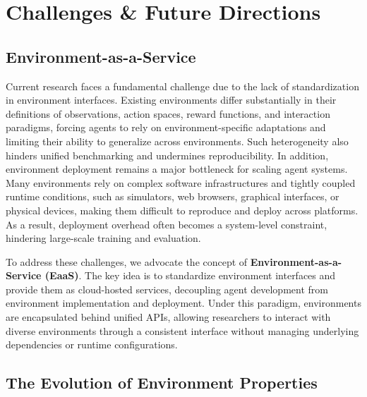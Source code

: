 
\section{Challenges \& Future Directions}\label{sec:future}

\subsection{Environment-as-a-Service}


Current research faces a fundamental challenge due to the lack of standardization in environment interfaces. 
Existing environments differ substantially in their definitions of observations, action spaces, reward functions, and interaction paradigms, forcing agents to rely on environment-specific adaptations and limiting their ability to generalize across environments. 
Such heterogeneity also hinders unified benchmarking and undermines reproducibility.
In addition, environment deployment remains a major bottleneck for scaling agent systems.
Many environments rely on complex software infrastructures and tightly coupled runtime conditions, such as simulators, web browsers, graphical interfaces, or physical devices, making them difficult to reproduce and deploy across platforms. 
As a result, deployment overhead often becomes a system-level constraint, hindering large-scale training and evaluation.

To address these challenges, we advocate the concept of \textbf{Environment-as-a-Service (EaaS)}. The key idea is to standardize environment interfaces and provide them as cloud-hosted services, decoupling agent development from environment implementation and deployment. Under this paradigm, environments are encapsulated behind unified APIs, allowing researchers to interact with diverse environments through a consistent interface without managing underlying dependencies or runtime configurations.


\subsection{The Evolution of Environment Properties}

